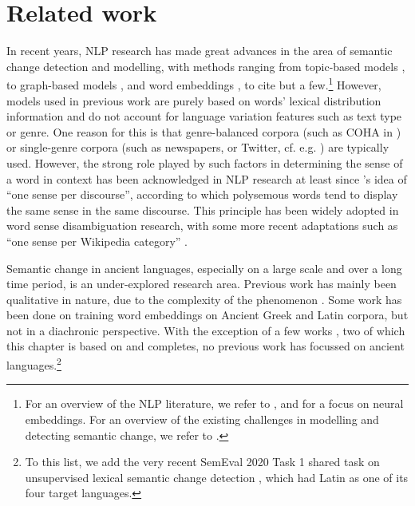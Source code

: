 \documentclass[output=paper]{langscibook}
\begin{document}
\section{Related work}
\label{sec:related}

In recent years, NLP research has made great advances in the area of semantic change detection and modelling, with methods ranging from topic-based models \citep{topicmodelswsd, cook-etal-2014-novel,lau2014learning,wijaya2011understanding, frermann-lapata-2016-bayesian}, to graph-based models \citep{mitra-etal-2014-thats,mitra2015automatic,tahmasebi-ranlp17}, and word embeddings \citep{kim-etal-2014-temporal,basile2018,kulkarni2015statistically,hamilton-etal-2016-diachronic,dubossarsky-etal-2017-outta,tahmasebi2018study,rudolphb18-dynamicembforlangevo,jatowt2018every,dubossarsky-etal-2019-time}, to cite but a few.\footnote{For an overview of the NLP literature, we refer to
\citet{tahmasebi2018survey}, and \citet{kutuzov-etal-2018-diachronic} for a focus on neural embeddings. For an overview of the existing challenges in modelling and detecting semantic change, we refer to .}
However, models used in previous work are purely based on words' lexical distribution information and do not account for language variation features such as text type or genre. One reason for this is that genre-balanced corpora (such as COHA in \citealp{davies2012expanding}) or single-genre corpora (such as newspapers, or Twitter, cf. e.g. \citealp{shoemark-etal-2019-room}) are typically used. 
However, the strong role played by such factors in determining the sense of a word in context has been acknowledged in NLP research at least since \citet{gale-etal-1992-one}'s idea of ``one sense per discourse'', according to which polysemous words tend to display the same sense in the same discourse. This principle has been widely adopted in word sense disambiguation research, with some more recent adaptations such as ``one sense per Wikipedia category'' \citep{scarlini-etal-2020-sense}.



Semantic change in ancient languages, especially on a large scale and over a long time period, is an under-explored research area. Previous work has mainly been  qualitative in nature, due to the complexity of the phenomenon \citep[cf. e.g.][]{leiwoetal2012, clackson}. 
Some work has been done on training word embeddings on Ancient Greek \citep{rodda2019} and Latin \citep{sprugnoli} corpora, but not in a diachronic perspective.
With the exception of a few works \citep{bamman2011,eger-mehler-2016-linearity,rodda2016,perrone-etal-2019-gasc,mcgillivray2019computational}, two of which this chapter is based on and completes, no previous work has focussed on ancient languages.\footnote{To this list, we add the very recent SemEval 2020 Task 1 shared task on unsupervised lexical semantic change detection \citep{schlechtweg-etal-2020-semeval}, which had Latin as one of its four target languages.}
\end{document}
